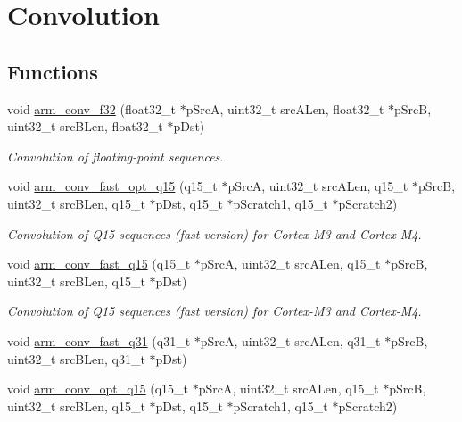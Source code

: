 \hypertarget{group__Conv}{}\section{Convolution}
\label{group__Conv}
\subsection*{Functions}
\begin{DoxyCompactItemize}
\item 
void \hyperlink{group__Conv_ga3f860dc98c6fc4cafc421e4a2aed3c89}{arm\+\_\+conv\+\_\+f32} (float32\+\_\+t $\ast$p\+SrcA, uint32\+\_\+t src\+A\+Len, float32\+\_\+t $\ast$p\+SrcB, uint32\+\_\+t src\+B\+Len, float32\+\_\+t $\ast$p\+Dst)
\begin{DoxyCompactList}\small\item\em Convolution of floating-\/point sequences. \end{DoxyCompactList}\item 
void \hyperlink{group__Conv_gaf16f490d245391ec18a42adc73d6d749}{arm\+\_\+conv\+\_\+fast\+\_\+opt\+\_\+q15} (q15\+\_\+t $\ast$p\+SrcA, uint32\+\_\+t src\+A\+Len, q15\+\_\+t $\ast$p\+SrcB, uint32\+\_\+t src\+B\+Len, q15\+\_\+t $\ast$p\+Dst, q15\+\_\+t $\ast$p\+Scratch1, q15\+\_\+t $\ast$p\+Scratch2)
\begin{DoxyCompactList}\small\item\em Convolution of Q15 sequences (fast version) for Cortex-\/\+M3 and Cortex-\/\+M4. \end{DoxyCompactList}\item 
void \hyperlink{group__Conv_gad75ca978ce906e04abdf86a8d76306d4}{arm\+\_\+conv\+\_\+fast\+\_\+q15} (q15\+\_\+t $\ast$p\+SrcA, uint32\+\_\+t src\+A\+Len, q15\+\_\+t $\ast$p\+SrcB, uint32\+\_\+t src\+B\+Len, q15\+\_\+t $\ast$p\+Dst)
\begin{DoxyCompactList}\small\item\em Convolution of Q15 sequences (fast version) for Cortex-\/\+M3 and Cortex-\/\+M4. \end{DoxyCompactList}\item 
void \hyperlink{group__Conv_ga51112dcdf9b3624eb05182cdc4da9ec0}{arm\+\_\+conv\+\_\+fast\+\_\+q31} (q31\+\_\+t $\ast$p\+SrcA, uint32\+\_\+t src\+A\+Len, q31\+\_\+t $\ast$p\+SrcB, uint32\+\_\+t src\+B\+Len, q31\+\_\+t $\ast$p\+Dst)
\item 
void \hyperlink{group__Conv_gac77dbcaef5c754cac27eab96c4753a3c}{arm\+\_\+conv\+\_\+opt\+\_\+q15} (q15\+\_\+t $\ast$p\+SrcA, uint32\+\_\+t src\+A\+Len, q15\+\_\+t $\ast$p\+SrcB, uint32\+\_\+t src\+B\+Len, q15\+\_\+t $\ast$p\+Dst, q15\+\_\+t $\ast$p\+Scratch1, q15\+\_\+t $\ast$p\+Scratch2)

\end{DoxyCompactItemize}
